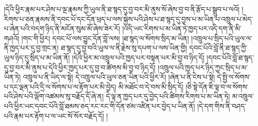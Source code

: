 །དེའི་ཕྱིར་རྣམ་པར་ཤེས་པ་ལྔ་རྣམས་ཀྱི་ཡུལ་ནི་ཐ་སྙད་དུ་བྱ་བར་མི་ནུས་སོ་ཞེས་བྱ་བ་ནི་རྩོད་པ་སྒྲུབ་པ་ལའོ། །རིགས་པ་ཅན་རྣམས་ནི་དབང་པོ་དང་དོན་ཕྲད་པ་ལས་སྐྱེས་པའི་ཤེས་པ་ཐ་སྙད་དུ་བྱས་པ་མ་ཡིན་པ་འཁྲུལ་པ་མེད་པ་ཞེན་པའི་བདག་ཉིད་ནི་མངོན་སུམ་མོ་ཞེས་ཟེར་རོ། །འདི་ཡང་རིགས་པ་མ་ཡིན་ཏེ་ཁྱད་པར་འདི་དག་ནི་མི་གཤའོ། །གང་གི་ཕྱིར། དབང་པོ་ལས་བྱུང་དོན་བློ་ལས། །ཐ་སྙད་ལ་སོགས་སྲིད་མ་ཡིན། །འཁྲུལ་པ་སྲིད་པའི་ཡུལ་ལ་ནི་ཁྱད་པར་དུ་བྱ་གྲང་ན། ཐ་སྙད་དུ་བྱ་བའི་ཡུལ་ལ་ནི་རྗེས་སུ་དཔག་པ་ལས་ཡིན་གྱི། དབང་པོའི་བློ་ནི་ཐ་སྙད་ཀྱི་ཡུལ་ཉིད་དུ་སྲིད་པ་མ་ཡིན་ནོ། །དེའི་ཕྱིར་མ་འཁྲུལ་པའི་ཁྱད་པར་བསྟན་པར་མི་བྱ་བ་ཉིད་དོ། །དབང་པོའི་བློ་ཐ་སྙད་དུ་བྱ་བར་མི་ནུས་པ་དེའི་ཕྱིར་ཁྱད་པར་དུ་བྱ་བ་ཚིགས་མི་བྱ་བ་ཉིད་དོ། །འཁྲུལ་པའི་ཁྱད་པར་ཉིད་ཀྱང་སྲིད་པ་མ་ཡིན་ཏེ། འཁྲུལ་པ་ནི་ཡིད་ལ་སྟེ། དེ་འཁྲུལ་པའི་ཡུལ་ཅན་ཡིན་པའི་ཕྱིར་རོ། །ཞེན་པ་ནི་ངེས་པ་སྟེ། དེ་སྤྱི་ལ་སོགས་པ་དང་ལྡན་པའི་དྲི་ལ་སོགས་པ་ལ་རྟོག་པར་མི་བྱེད། མི་མཐོང་བ་དེ་བས་མི་སྲིད་དོ། །ཅི་སྟེ་དོན་ཇི་ལྟ་བ་ལ་སོགས་པའི་ཤེས་པའི་ལྡོག་འཚམས་སུ་བརྗོད་དོ་ཞེ་ན། དེ་ལྟ་ན་ཁྱད་པར་དུ་བྱེད་པའི་ཚིགས་རིགས་པ་མ་ཡིན་ཏེ། མ་འཁྲུལ་པའི་ཕྱིར་ཡང་དབང་པོའི་བློ་ཐམས་ཅད་རང་རང་གི་དོན་ཙམ་འཛིན་པར་བྱེད་པ་ཡིན་ནོ། །དེ་དག་གིས་ནི་བཤད་པའི་རྣམ་པར་རྟོག་པ་ལ་ཡང་སོ་སོར་བརྗོད་དོ། །
